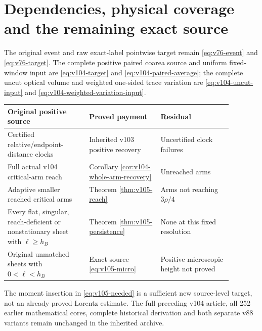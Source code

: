 \section{Dependencies, physical coverage and the remaining exact source}
\label{app:v105-map}
The original event and raw exact-label pointwise target remain
\eqref{eq:v76-event} and \eqref{eq:v76-target}. The complete
positive paired coarea source and uniform fixed-window input are
\eqref{eq:v104-target} and \eqref{eq:v104-paired-average};
the complete uncut optical volume and weighted one-sided trace
variation are \eqref{eq:v104-uncut-input} and
\eqref{eq:v104-weighted-variation-input}.
\begin{center}
\begin{tabular}{p{0.32\linewidth}p{0.28\linewidth}p{0.28\linewidth}}
\textbf{Original positive source}&\textbf{Proved payment}&
\textbf{Residual}\\ \hline
Certified relative/endpoint-distance clocks&
Inherited v103 positive recovery&Uncertified clock failures\\
Full actual v104 critical-arm reach&
Corollary \ref{cor:v104-whole-arm-recovery}&Unreached arms\\
Adaptive smaller reached critical arms&
Theorem \ref{thm:v105-reach}&Arms not reaching $3\rho/4$\\
Every flat, singular, reach-deficient or nonstationary
sheet with $\ell\ge h_B$&
Theorem \ref{thm:v105-persistence}&None at this fixed resolution\\
Original unmatched sheets with $0<\ell<h_B$&
Exact source \eqref{eq:v105-micro}&Positive microscopic height not proved
\end{tabular}
\end{center}
The moment insertion in \eqref{eq:v105-needed} is a sufficient
new source-level target, not an already proved Lorentz estimate.
The full preceding v104 article, all 252 earlier mathematical
cores, complete historical derivation and both separate v88
variants remain unchanged in the inherited archive.